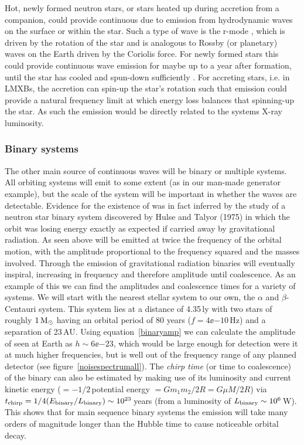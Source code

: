 Hot, newly formed neutron stars, or stars heated up during accretion from a companion, could provide
continuous \gws due to emission from hydrodynamic waves on the surface or within the star. Such a
type of wave is the r-mode \cite{Andersson:1998}, which is driven by the rotation of the star and is
analogous to Rossby (or planetary) waves on the Earth driven by the Coriolis force. For newly formed
stars this could provide continuous wave emission for maybe up to a year after formation, until the
star has cooled and spun-down sufficiently \cite{Schutz:1999}. For accreting stars, i.e. in LMXBs,
the accretion can spin-up the star's rotation such that \gw emission could provide a natural
frequency limit at which \gw energy loss balances that spinning-up the star. As such the \gw
emission would be directly related to the systems X-ray luminosity.

\subsubsection{Binary systems} 
The other main source of continuous waves will be binary or multiple systems. All orbiting systems
will emit \gws to some extent (as in our man-made generator example), but the scale of the system
will be important in whether the waves are detectable. Evidence for the existence of \gws was in
fact inferred by the study of a neutron star binary system discovered by Hulse and Talyor (1975)
\cite{HulseTaylor:1975, TaylorWeisberg:1989} in which the orbit was losing energy exactly as
expected if carried away by gravitational radiation. As seen above \gws will be emitted at twice the
frequency of the orbital motion, with the amplitude proportional to the frequency squared and the
masses involved. Through the emission of gravitational radiation binaries will eventually inspiral,
increasing in frequency and therefore amplitude until coalescence. As an example of this we can find
the \gw amplitudes and coalescence times for a variety of systems. We will start with the nearest
stellar system to our own, the $\alpha$ and $\beta$-Centauri system. This system lies at a distance
of 4.35\,ly with two stars of roughly $1\,{\rm M}_{\odot}$ having an orbital period of 80 years ($f
= 4\ee{-10}$\,Hz) and a separation of 23\,AU. Using equation~\ref{binaryamp} we can calculate the
amplitude of \gws seen at Earth as $h \sim 6\ee{-23}$, which would be large enough for detection
were it at much higher frequencies, but is well out of the frequency range of any planned detector
(see figure~\ref{noisespectrumall}). The {\it chirp time} (or time to coalescence) of the binary can
also be estimated by making use of its luminosity and current kinetic energy ($ = -1/2$\,potential
energy $= Gm_1m_2/2R = G\mu{}M/2R$) via $t_{\rm chirp} = 1/4(E_{\rm binary}/L_{\rm binary}) \sim
10^{23}$\,years (from a luminosity of $L_{\rm binary} \sim 10^6$\,W). This shows that for main
sequence binary systems the \gw emission will take many orders of magnitude longer than the Hubble
time to cause noticeable orbital decay.


